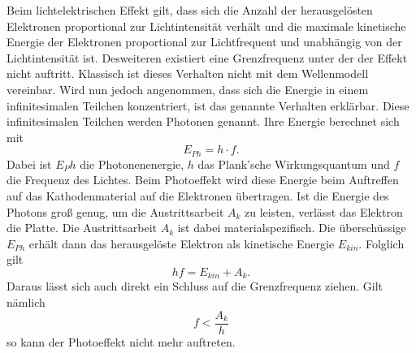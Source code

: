 Beim lichtelektrischen Effekt gilt, dass sich die Anzahl der herausgelösten Elektronen proportional zur Lichtintensität verhält und die maximale kinetische Energie der Elektronen
proportional zur Lichtfrequent und unabhängig von der Lichtintensität ist. 
Desweiteren existiert eine Grenzfrequenz unter der der Effekt nicht auftritt.
Klassisch ist dieses Verhalten nicht mit dem Wellenmodell vereinbar. Wird nun jedoch angenommen, dass sich die Energie in einem infinitesimalen Teilchen konzentriert, ist das
genannte Verhalten erklärbar. Diese infinitesimalen Teilchen werden Photonen genannt. Ihre Energie berechnet sich mit
\begin{equation*}
    E_{Ph} = h \cdot f.
\end{equation*}
Dabei ist $E_Ph$ die Photonenenergie, $h$ das Plank'sche Wirkungsquantum und $f$ die Frequenz des Lichtes.
Beim Photoeffekt wird diese Energie beim Auftreffen auf das Kathodenmaterial auf die Elektronen übertragen. Ist die Energie des Photons groß genug, um die 
Austrittsarbeit $A_k$ zu leisten, verlässt das Elektron die Platte. Die Austrittsarbeit $A_k$ ist dabei materialspezifisch. Die überschüssige $E_{Ph}$ erhält dann das 
herausgelöste Elektron als kinetische Energie $E_{kin}$. Folglich gilt
\begin{equation*}
    hf = E_{kin} + A_k.
\end{equation*}
Daraus lässt sich auch direkt ein Schluss auf die Grenzfrequenz ziehen. Gilt nämlich
\begin{equation*}
    f < \frac{A_k}{h}
\end{equation*}
so kann der Photoeffekt nicht mehr auftreten.
